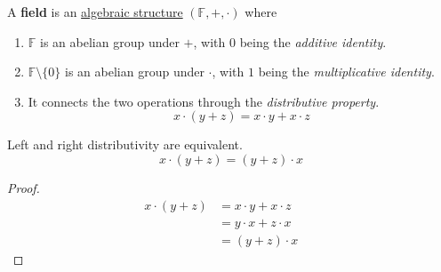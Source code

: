   \begin{definition}[Ring]
    \label{def:ring}
    
  \end{definition}

  \begin{definition}[Field]
    \label{def:field}
    A \textbf{field} is an \hyperref[alg-def:algebraic-structure]{algebraic structure} $(\mathbb{F}, +, \cdot)$ where 
    \begin{enumerate}
      \item $\mathbb{F}$ is an abelian group under $+$, with $0$ being the \textit{additive identity}. 
      \item $\mathbb{F} \setminus \{0\}$ is an abelian group under $\cdot$, with $1$ being the \textit{multiplicative identity}. 
      \item It connects the two operations through the \textit{distributive property}.
      \begin{equation}
        x \cdot (y + z) = x \cdot y + x \cdot z
      \end{equation}
    \end{enumerate}
  \end{definition} 

  \begin{lemma}[Left = Right Distributivity]
    \label{thm:left-right-distributivity}
    Left and right distributivity are equivalent. 
    \begin{equation}
      x \cdot (y + z) = (y + z) \cdot x
    \end{equation}
  \end{lemma} 
  \begin{proof}
    \begin{align}
      x \cdot (y + z) & = x \cdot y + x \cdot z && \tag{Distributive} \\
                      & = y \cdot x + z \cdot x && \tag{Commutative} \\
                      & = (y + z) \cdot x && \tag{Distributive} 
    \end{align}
  \end{proof} 

